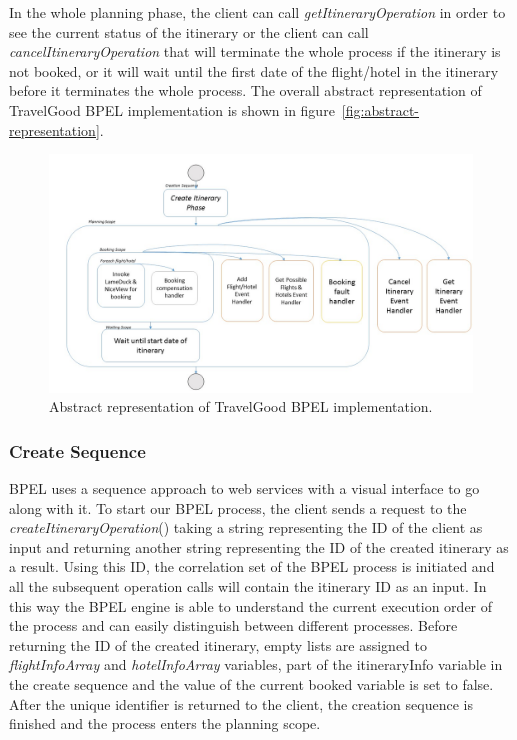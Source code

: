 In the whole planning phase, the client can call \textit{getItineraryOperation} in order to see the current status of the itinerary or the client can call \textit{cancelItineraryOperation} that will terminate the whole process if the itinerary is not booked, or it will wait until the first date of the flight/hotel in the itinerary before it terminates the whole process. The overall abstract representation of TravelGood BPEL implementation is shown in figure~\ref{fig:abstract-representation}.

\begin{figure}[H]
\centering
\includegraphics[width=\textwidth]{images/bpel_abstract_impl.jpg}
\caption{Abstract representation of TravelGood BPEL implementation.} \label{fig:abstract-representation}
\label{statediagram}
\end{figure}

\subsubsection*{Create Sequence}
BPEL uses a sequence approach to web services with a visual interface to go along with it. To start our BPEL process, the client sends a request to the \textit{createItineraryOperation}() taking a string representing the ID of the client as input and returning another string representing the ID of the created itinerary as a result. Using this ID, the correlation set of the BPEL process is initiated and all the subsequent operation calls will contain the itinerary ID as an input. In this way the BPEL engine is able to understand the current execution order of the process and can easily distinguish between different processes. Before returning the ID of the created itinerary, empty lists are assigned  to \textit{flightInfoArray} and \textit{hotelInfoArray} variables, part of the itineraryInfo variable in the create sequence and the value of the current booked variable is set to false. After the unique identifier is returned to the client, the creation sequence is finished and the process enters the planning scope.

